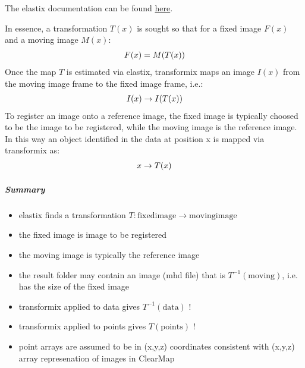\documentclass[letterpaper,10pt,english]{sphinxmanual}
\begin{document}
The elastix documentation can be found \href{http://elastix.isi.uu.nl/}{here}.

In essence, a transformation \(T(x)\) is sought so that for a fixed image
\(F(x)\) and a moving image \(M(x)\):
\begin{gather}
\begin{split}F(x) = M(T(x))\end{split}\notag
\end{gather}
Once the map \(T\) is estimated via elastix, transformix maps an image
\(I(x)\) from the moving image frame to the fixed image frame, i.e.:
\begin{gather}
\begin{split}I(x) \rightarrow I(T(x))\end{split}\notag
\end{gather}
To register an image onto a reference image, the fixed image is typically
choosed to be the image to be registered, while the moving image is the
reference image. In this way an object identified in the data at position x
is mapped via transformix as:
\begin{gather}
\begin{split}x \rightarrow T(x)\end{split}\notag
\end{gather}

\subparagraph{Summary}
\label{api/ClearMap.Alignment:summary}\begin{itemize}
\item {} 
elastix finds a transformation \(T: \mathrm{fixed image} \rightarrow \mathrm{moving image}\)

\item {} 
the fixed image is image to be registered

\item {} 
the moving image is typically the reference image

\item {} 
the result folder may contain an image (mhd file) that is \(T^{-1}(\mathrm{moving})\),
i.e. has the size of the fixed image

\item {} 
transformix applied to data gives \(T^{-1}(\mathrm{data})\) !

\item {} 
transformix applied to points gives \(T(\mathrm{points})\) !

\item {} 
point arrays are assumed to be in (x,y,z) coordinates consistent with (x,y,z) array represenation of images in ClearMap

\end{itemize}
\end{document}
